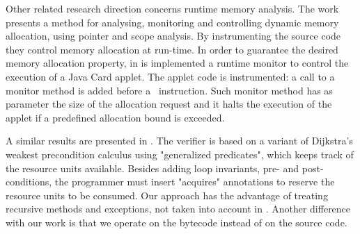 Other related research direction concerns runtime memory analysis. The work \cite{GNYZ04pir} presents a method for analysing, monitoring and controlling dynamic memory allocation, using pointer and scope analysis. By instrumenting the source code they control memory allocation at run-time. In order to guarantee the desired memory allocation property, in \cite{fredlund04gcp} is implemented a runtime monitor to control the execution of a Java Card applet. The applet code is instrumented: a call to a monitor method is added before a \new\ instruction. Such monitor method has as parameter the size of the allocation request and it halts the execution of the applet if a predefined allocation bound is exceeded. 


A similar results are presented in  \cite{ChanderEILN05}. The verifier is based on a variant of Dijkstra's
weakest precondition calculus using "generalized predicates", which keeps
track of the resource units available. Besides adding loop invariants,
pre- and post-conditions, the programmer must insert "acquires"
annotations to reserve the resource units to be consumed. Our approach has
the advantage of treating recursive methods and exceptions, not taken into
account in \cite{ChanderEILN05}. Another difference with our work is that we
operate on the bytecode instead of on the source code.



